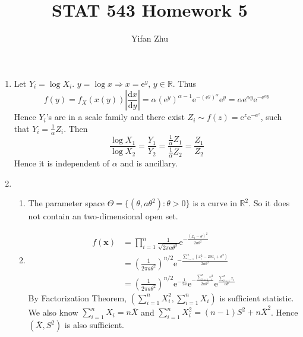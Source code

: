 \documentclass{article}
\begin{document}
\setcounter{MaxMatrixCols}{20}



\title{STAT 543 Homework 5}
\author{Yifan Zhu}
\maketitle

\begin{enumerate}[leftmargin = 0 em, label = \arabic*., font = \bfseries]
	\item
	      Let $Y_i = \log X_i$. $y = \log x \Rightarrow x = \mathrm{e}^y,\, y \in \mathbb{R}$. Thus
	      \[f(y) = f_X (x(y)) \left|\frac{\mathrm{d}x}{\mathrm{d}y}\right| = \alpha (\mathrm{e}^y)^{\alpha - 1} \mathrm{e}^{-(\mathrm{e}^y)^\alpha} \mathrm{e}^y  = \alpha \mathrm{e}^{\alpha y} \mathrm{e}^{-\mathrm{e}^{\alpha y}}\]
	      Hence $Y_i$'s are in a scale family and there exist $Z_i \sim f(z) = \mathrm{e}^z \mathrm{e}^{-\mathrm{e}^z}$, such that $Y_i = \frac{1}{\alpha} Z_i$. Then
	      \[\frac{\log X_1} {\log X_2} = \frac{Y_1}{Y_2} = \frac{\frac{1}{\alpha} Z_1} {\frac{1}{\alpha} Z_2} = \frac{Z_1}{Z_2}\]
	      Hence it is independent of $\alpha$ and is ancillary.

	      \item 
	      \begin{enumerate}
	      	\item 
	      	The parameter space $\Theta = \{(\theta , a \theta^2): \theta > 0\}$ is a curve in $\mathbb{R}^2$. So it does not contain an two-dimensional open set.
	      	\item 
	      	\begin{align*}
	      	 f(\bm x) & = \prod_{i = 1}^n \frac{1}{\sqrt{2 \pi a \theta^2}} \mathrm{e}^{- \frac{(x_i - \theta)^2}{2 a \theta^2}}\\
	      	 & = \left(\frac{1}{2 \pi a \theta^2}\right)^{n/2} \mathrm{e}^{- \frac{\sum_{i=1}^n (x_i^2 - 2 \theta x_i + \theta^2)}{2 a \theta^2}}\\
	      	 & = \left(\frac{1}{2 \pi a \theta^2}\right)^{n / 2} \mathrm{e}^{-\frac{1}{2 a}} \mathrm{e}^{-\frac{\sum_{i=1}^n x_i^2}{2 a \theta^2}} \mathrm{e}^{\frac{\sum_{i=1}^n x_i}{a \theta}}
	      	 \end{align*}
	      	 By Factorization Theorem, $(\sum_{i=1}^n X_i^2, \sum_{i=1}^n X_i)$ is sufficient statistic. We also know $\sum_{i=1}^n X_i = n \bar{X}$ and $\sum_{i=1}^n X_i^2 = (n-1)S^2 + n\bar{X}^2$. Hence $(\bar{X}, S^2)$ is also sufficient.


\end{enumerate}
\end{enumerate}
\end{document}
